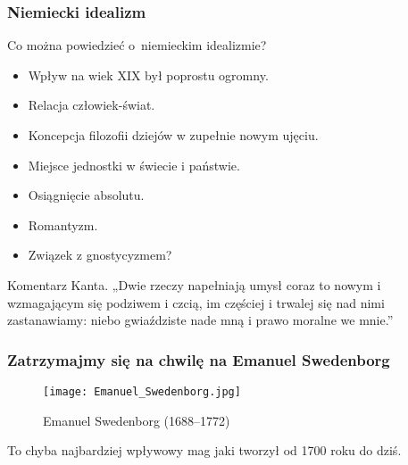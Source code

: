 \documentclass[10pt,t]{beamer}
\begin{document}
\begin{frame}
\begin{frame}
\end{frame}




\begin{frame}
  \frametitle{Niemiecki idealizm}


  Co można powiedzieć o~niemieckim idealizmie?
  \begin{itemize}

  \item Wpływ na wiek XIX był poprostu ogromny.

  \item Relacja człowiek-świat.

  \item Koncepcja filozofii dziejów w zupełnie nowym ujęciu.

  \item Miejsce jednostki w świecie i państwie.

  \item Osiągnięcie absolutu.

  \item Romantyzm.

  \item Związek z gnostycyzmem?

  \end{itemize}

  Komentarz Kanta. „Dwie rzeczy napełniają umysł coraz to nowym i
  wzmagającym się podziwem i czcią, im częściej i trwalej się nad nimi
  zastanawiamy: niebo gwiaździste nade mną i prawo moralne we mnie.”

\end{frame}





\begin{frame}
  \frametitle{Zatrzymajmy się na chwilę na Emanuel Swedenborg}


  \begin{figure}

    \centering

    \texttt{[image: Emanuel\_Swedenborg.jpg]}


    \caption{Emanuel Swedenborg (1688--1772)}

\end{figure}


To chyba najbardziej wpływowy mag jaki tworzył od 1700 roku do dziś.

\end{frame}





\end{frame}
\end{document}
